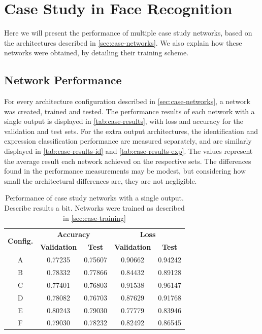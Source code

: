 \section{Case Study in Face Recognition} \label{sec:case-results}

Here we will present the performance of multiple case study networks, based on the architectures described in \autoref{sec:case-networks}. We also explain how these networks were obtained, by detailing their training scheme. 

\subsection{Network Performance}

For every architecture configuration described in \autoref{sec:case-networks}, a network was created, trained and tested. The performance results of each network with a single output is displayed in \autoref{tab:case-results}, with loss and accuracy for the validation and test sets. For the extra output architectures, the identification and expression classification performance are measured separately, and are similarly displayed in \autoref{tab:case-results-id} and \autoref{tab:case-results-exp}. The values represent the average result each network achieved on the respective sets. The differences found in the performance measurements may be modest, but considering how small the architectural differences are, they are not negligible.

\begin{table}[h!]
\begin{center}
\begin{tabular}{|c|c|c|c|c|}
\hline
\multirow{2}{*}{\textbf{Config.}} & \multicolumn{2}{|c|}{\textbf{Accuracy}} & \multicolumn{2}{|c|}{\textbf{Loss}} \\ \cline{2-5}
 & \textbf{Validation} & \textbf{Test} & \textbf{Validation} & \textbf{Test} \\ \hline
A & 0.77235 & 0.75607 & 0.90662 & 0.94242 \\ \hline
B & 0.78332 & 0.77866 & 0.84432 & 0.89128 \\ \hline
C & 0.77401 & 0.76803 & 0.91538 & 0.96147 \\ \hline
D & 0.78082 & 0.76703 & 0.87629 & 0.91768 \\ \hline
E & 0.80243 & 0.79030 & 0.77779 & 0.83946 \\ \hline
F & 0.79030 & 0.78232 & 0.82492 & 0.86545 \\ \hline
\end{tabular}
\end{center}
\caption[Performance of case study networks with a single output]{Performance of case study networks with a single output. Describe results a bit. Networks were trained as described in \autoref{sec:case-training}}
\label{tab:case-results}
\end{table}


